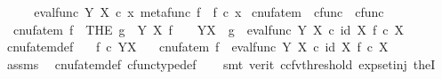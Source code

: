 \begin{isabellebody}
\ \ \isamarkupfalse%
\ \isamarkupfalse%
\ {\isachardoublequoteopen}eval{\isacharunderscore}{\kern0pt}func\ Y\ X\ {\isasymcirc}\isactrlsub c\ {\isasymlangle}x{\isacharcomma}{\kern0pt}\ metafunc\ f{\isasymrangle}\ {\isacharequal}{\kern0pt}\ f\ {\isasymcirc}\isactrlsub c\ x{\isachardoublequoteclose}\isacommand{{\isachardot}{\kern0pt}}\isamarkupfalse%
\isanewline
{}\isamarkupfalse%
%
\endisatagproof
{\isafoldproof}%
%
\isadelimproof
%
\endisadelimproof
%
\isadelimdocument
%
\endisadelimdocument
%
\isatagdocument
%
\isamarkuptrue%
%
\endisatagdocument
{\isafolddocument}%
%
\isadelimdocument
%
\endisadelimdocument
{}\isamarkupfalse%
\ cnufatem\ {\isacharcolon}{\kern0pt}{\isacharcolon}{\kern0pt}\ {\isachardoublequoteopen}cfunc\ {\isasymRightarrow}\ cfunc{\isachardoublequoteclose}\ \isanewline
\ \ {\isachardoublequoteopen}cnufatem\ f\ {\isacharequal}{\kern0pt}\ {\isacharparenleft}{\kern0pt}THE\ g{\isachardot}{\kern0pt}\ {\isasymforall}\ Y\ X{\isachardot}{\kern0pt}\ f\ {\isacharcolon}{\kern0pt}\ {\isasymone}\ {\isasymrightarrow}\ Y\isactrlbsup X\isactrlesup \ {\isasymlongrightarrow}\ g\ {\isacharequal}{\kern0pt}\ eval{\isacharunderscore}{\kern0pt}func\ Y\ X\ {\isasymcirc}\isactrlsub c\ {\isasymlangle}id\ X{\isacharcomma}{\kern0pt}\ f\ {\isasymcirc}\isactrlsub c\ {\isasymbeta}\isactrlbsub X\isactrlesub {\isasymrangle}{\isacharparenright}{\kern0pt}{\isachardoublequoteclose}\isanewline
\isanewline
{}\isamarkupfalse%
\ cnufatem{\isacharunderscore}{\kern0pt}def{}{\isacharcolon}{\kern0pt}\isanewline
\ \ \ {\isachardoublequoteopen}f\ {\isasymin}\isactrlsub c\ Y\isactrlbsup X\isactrlesup {\isachardoublequoteclose}\isanewline
\ \ \ {\isachardoublequoteopen}cnufatem\ f\ {\isacharequal}{\kern0pt}\ eval{\isacharunderscore}{\kern0pt}func\ Y\ X\ {\isasymcirc}\isactrlsub c\ {\isasymlangle}id\ X{\isacharcomma}{\kern0pt}\ f\ {\isasymcirc}\isactrlsub c\ {\isasymbeta}\isactrlbsub X\isactrlesub {\isasymrangle}{\isachardoublequoteclose}\isanewline
%
\isadelimproof
\ \ %
\endisadelimproof
%
\isatagproof
{}\isamarkupfalse%
\ assms\ \isamarkupfalse%
\ cnufatem{\isacharunderscore}{\kern0pt}def\ cfunc{\isacharunderscore}{\kern0pt}type{\isacharunderscore}{\kern0pt}def\isanewline
\ \ \isamarkupfalse%
\ {\isacharparenleft}{\kern0pt}smt\ {\isacharparenleft}{\kern0pt}verit{\isacharcomma}{\kern0pt}\ ccfv{\isacharunderscore}{\kern0pt}threshold{\isacharparenright}{\kern0pt}\ exp{\isacharunderscore}{\kern0pt}set{\isacharunderscore}{\kern0pt}inj\ theI{\isacharprime}{\kern0pt}{\isacharparenright}{\kern0pt}%

\end{isabellebody}
